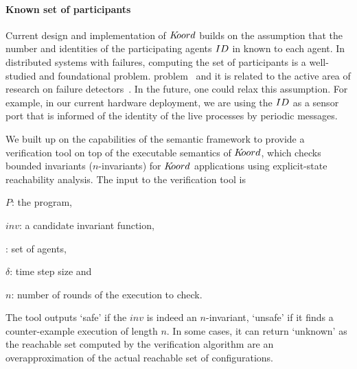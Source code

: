 \paragraph*{Known set of participants}
Current design and implementation of $K\kern-2pt oord$ builds on the assumption that the number and identities of the participating agents $ID$ in known to each agent. In distributed systems with failures, computing the set of participants is a well-studied and foundational problem. problem~\cite{AlistarhAGG2011} and it is related to the active area of research on failure detectors~\cite{Chandra:1996,delporte2004weakest}. In the future, one could  relax this  assumption. For example, in our current hardware deployment, we are using the $ID$ as a sensor port that is informed of the identity of the live processes by periodic messages. 


We built up on the capabilities of the \K semantic framework to provide a verification tool on top of the executable semantics of $K\kern-2pt oord$, which checks bounded invariants ($n$-invariants) for $K\kern-2pt oord$ applications using explicit-state reachability analysis. The input to the verification tool is 
\begin{inparaenum}[(i)] 
    \item $P$: the program, 
    \item $\mathit{inv}$: a candidate invariant function, 
    \item {\UINS}: set of agents, 
    \item $\delta$: time step size and 
    \item $n$: number of rounds of the execution to check.
\end{inparaenum}

The tool outputs `safe' if the $\mathit{inv}$ is indeed an $n$-invariant, `unsafe' if it finds a counter-example execution of length $n$. In some cases, it can return `unknown' as the reachable set computed by the verification algorithm are an overapproximation of the actual reachable set of configurations.  

